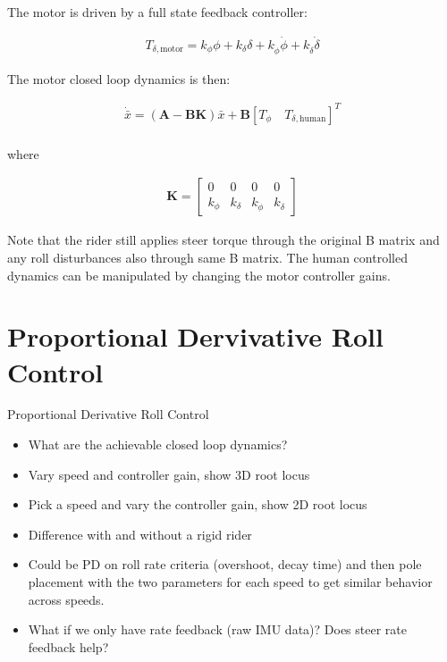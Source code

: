\documentclass[12pt]{article}
\begin{document}
The motor is driven by a full state feedback controller:

\begin{align}
  T_{\delta,\textrm{motor}} =
  k_\phi \phi +
  k_\delta \delta +
  k_{\dot{\phi}} \dot{\phi} +
  k_{\dot{\delta}} \dot{\delta}
\end{align}

The motor closed loop dynamics is then:

\begin{align}
  \dot{\bar{x}} = \left( \mathbf{A} - \mathbf{B} \mathbf{K} \right) \bar{x} +
  \mathbf{B} \left[ T_\phi \quad T_{\delta,\textrm{human}} \right]^T \\
\end{align}

where

\begin{align}
  \mathbf{K} =
  \begin{bmatrix}
    0 & 0 & 0 & 0 \\
    k_\phi & k_\delta & k_{\dot{\phi}} & k_{\dot{\delta}}
  \end{bmatrix}
\end{align}

Note that the rider still applies steer torque through the original B matrix
and any roll disturbances also through same B matrix. The human controlled
dynamics can be manipulated by changing the motor controller gains.

\section{Proportional Dervivative Roll Control}

Proportional Derivative Roll Control

\begin{itemize}
  \item What are the achievable closed loop dynamics?
  \item Vary speed and controller gain, show 3D root locus
  \item Pick a speed and vary the controller gain, show 2D root locus
  \item Difference with and without a rigid rider
  \item Could be PD on roll rate criteria (overshoot, decay time) and then pole
    placement with the two parameters for each speed to get similar behavior
    across speeds.
  \item What if we only have rate feedback (raw IMU data)? Does steer rate
    feedback help?
\end{itemize}
\end{document}
